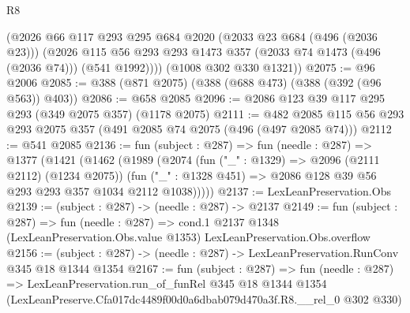 \begin{lexlean}{R8}
\begin{coremodule}
        (@2026
          @66
          @117
          @293
          @295
          @684
          @2020
          (@2033 @23 @684 (@496 (@2036 @23)))
          (@2026 @115 @56 @293 @293 @1473 @357 (@2033 @74 @1473 (@496 (@2036 @74))) (@541 @1992))))
      (@1008 @302 @330 @1321))
@2075 := @96 @2006
@2085 := @388 (@871 @2075) (@388 (@688 @473) (@388 (@392 (@96 @563)) @403))
@2086 := @658 @2085
@2096 := @2086 @123 @39 @117 @295 @293 (@349 @2075 @357) (@1178 @2075)
@2111 := @482 @2085 @115 @56 @293 @293 @2075 @357 (@491 @2085 @74 @2075 (@496 (@497 @2085 @74)))
@2112 := @541 @2085
@2136 := fun (subject : @287) =>
  fun (needle : @287) =>
  @1377
    (@1421
      (@1462
        (@1989
          (@2074
            (fun ("_" : @1329) => @2096 (@2111 @2112) (@1234 @2075))
            (fun ("_" : @1328 @451) => @2086 @128 @39 @56 @293 @293 @357 @1034 @2112 @1038)))))
@2137 := LexLeanPreservation.Obs
@2139 := (subject : @287) -> (needle : @287) -> @2137
@2149 := fun (subject : @287) =>
  fun (needle : @287) =>
  cond.{1} @2137 @1348 (LexLeanPreservation.Obs.value @1353) LexLeanPreservation.Obs.overflow
@2156 := (subject : @287) -> (needle : @287) -> LexLeanPreservation.RunConv @345 @18 @1344 @1354
@2167 := fun (subject : @287) =>
  fun (needle : @287) =>
  LexLeanPreservation.run_of_funRel
    @345
    @18
    @1344
    @1354
    (LexLeanPreserve.Cfa017dc4489f00d0a6dbab079d470a3f.R8.__rel_0 @302 @330)
\end{coremodule}
\end{lexlean}
